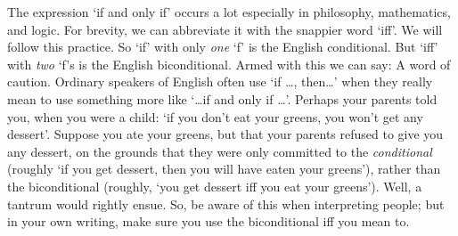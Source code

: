 The expression `if and only if' occurs a lot especially in philosophy, mathematics, and logic. For brevity, we can abbreviate it with the snappier word `iff'. We will follow this practice. So `if' with only \emph{one} `f' is the English conditional. But `iff' with \emph{two} `f's is the English biconditional. Armed with this we can say:
A word of caution. Ordinary speakers of English often use `if \ldots, then\ldots' when they really mean to use something more like `\ldots if and only if \ldots'. Perhaps your parents told you, when you were a child: `if you don't eat your greens, you won't get any dessert'. Suppose you ate your greens, but that your parents refused to give you any dessert, on the grounds that they were only committed to the \emph{conditional} (roughly `if you get dessert, then you will have eaten your greens'), rather than the biconditional (roughly, `you get dessert iff you eat your greens'). Well, a tantrum would rightly ensue. So, be aware of this when interpreting people; but in your own writing, make sure you use the biconditional iff you mean to.

